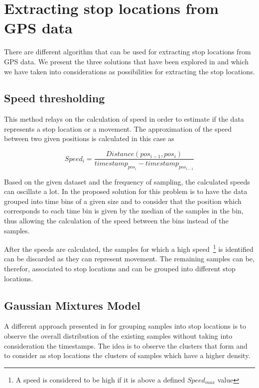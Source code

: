 \section{Extracting stop locations from GPS data}

There are different algorithm that can be used for extracting stop locations
from GPS data. We present the three solutions that have been
explored in \cite{cuttone2014inferring} and which we have taken into
considerations as possibilities for extracting the stop locations.

\subsection{Speed thresholding}

This method relays on the calculation of speed in order to estimate if the data
represents a stop location or a movement. The approximation of the speed between
two given positions is calculated in this case as

\begin{equation}
Speed_{i} = \frac{Distance(pos_{i-1},pos_{i})}{timestamp_{pos_{i}}-timestamp_{pos_{i-1}}}
\end{equation}

Based on the given dataset and the frequency of sampling, the calculated speeds
can oscillate a lot. In \cite{cuttone2014inferring} the proposed solution for
this problem is to have the data grouped into time bins of a given size and to
consider that the position which corresponds to each time bin is given by the
median of the samples in the bin, thus allowing the calculation of the speed
between the bins instead of the samples. 

After the speeds are calculated, the samples for which a high speed~\footnote{A
speed is considered to be high if it is above a defined $Speed_{max}$ value} is
identified can be discarded as they can represent movement. The remaining
samples can be, therefor, associated to stop locations and can be grouped into
different stop locations. 

\subsection{Gaussian Mixtures Model}

A different approach presented in \cite{cuttone2014inferring} for grouping
samples into stop locations is to observe the overall distribution of the
existing samples without taking into consideration the timestamps. The idea is
to observe the clusters that form and to consider as stop locations the clusters
of samples which have a higher density.

